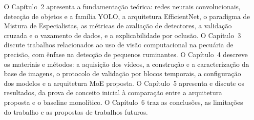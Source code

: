 O Capítulo~2 apresenta a fundamentação teórica: redes neurais convolucionais, detecção de objetos e a família YOLO, a arquitetura EfficientNet, o paradigma de Mistura de Especialistas, as métricas de avaliação de detectores, a validação cruzada e o vazamento de dados, e a explicabilidade por oclusão. O Capítulo~3 discute trabalhos relacionados ao uso de visão computacional na pecuária de precisão, com ênfase na detecção de pequenos ruminantes. O Capítulo~4 descreve os materiais e métodos: a aquisição dos vídeos, a construção e a caracterização da base de imagens, o protocolo de validação por blocos temporais, a configuração dos modelos e a arquitetura MoE proposta. O Capítulo~5 apresenta e discute os resultados, da prova de conceito inicial à comparação entre a arquitetura proposta e o baseline monolítico. O Capítulo~6 traz as conclusões, as limitações do trabalho e as propostas de trabalhos futuros.
